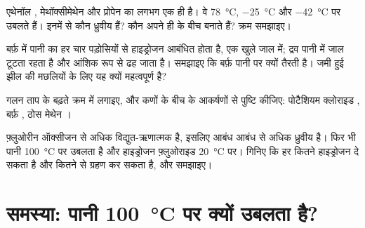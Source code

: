 \begin{exercise}[$\star\star\star$]\label{exo:g11:polarity-and-cohesion:12}
एथेनॉल , मेथॉक्सीमेथेन  और प्रोपेन
 का  लगभग एक ही है। वे
\qty{78}{\celsius}, \qty{-25}{\celsius} और \qty{-42}{\celsius} पर उबलते हैं। इनमें से
कौन ध्रुवीय हैं? कौन अपने ही  के बीच  बनाते हैं? क्रम
समझाइए।
\end{exercise}

\begin{exercise}[$\star\star\star$]\label{exo:g11:polarity-and-cohesion:13}
बर्फ़ में पानी का हर  चार पड़ोसियों से हाइड्रोजन आबंधित होता है, एक
खुले जाल में; द्रव पानी में जाल टूटता रहता है और आंशिक रूप से
ढह जाता है। समझाइए कि बर्फ़ पानी पर क्यों तैरती है। जमी हुई झील की मछलियों के लिए
यह क्यों महत्वपूर्ण है?
\end{exercise}

\begin{exercise}[$\star\star\star$]\label{exo:g11:polarity-and-cohesion:14}
गलन ताप के बढ़ते क्रम में लगाइए, और कणों के बीच के आकर्षणों से
पुष्टि कीजिए: पोटैशियम क्लोराइड , बर्फ़
, ठोस मेथेन ।
\end{exercise}

\begin{exercise}[$\star\star\star$]\label{exo:g11:polarity-and-cohesion:15}
फ़्लुओरीन ऑक्सीजन से अधिक विद्युत-ऋणात्मक है, इसलिए  आबंध
 आबंध से अधिक ध्रुवीय है। फिर भी पानी \qty{100}{\celsius} पर उबलता है
और हाइड्रोजन फ़्लुओराइड \qty{20}{\celsius} पर। गिनिए कि हर  कितने हाइड्रोजन
 दे सकता है और कितने  से ग्रहण कर सकता है, और
समझाइए।
\end{exercise}

\section{समस्या: पानी \texorpdfstring{\qty{100}{\celsius}}{100 डिग्री सेल्सियस} पर क्यों उबलता है?}

